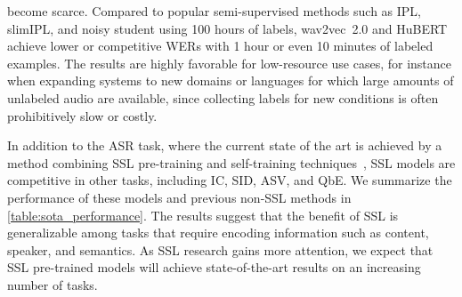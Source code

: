 become scarce. Compared to popular semi-supervised methods such as IPL,
slimIPL, and noisy student using 100 hours of labels, wav2vec~2.0 and HuBERT
achieve lower or competitive WERs with 1 hour or even 10 minutes of labeled
examples. The results are highly favorable for low-resource use cases, for instance when
expanding systems to new domains or languages for which large amounts of unlabeled
audio are available, since collecting labels for new conditions is often prohibitively
slow or costly.

In addition to the ASR task, where the current state of the art is achieved by a method
combining SSL pre-training and self-training 
techniques~\cite{zhang2020pushing}, SSL models 
  are competitive                %
in other tasks, including IC,
SID, ASV, and QbE. We summarize the performance of these models and previous
non-SSL methods in \cref{table:sota_performance}. The results suggest that the
benefit of SSL is generalizable among tasks that require encoding 
information such as content, speaker, and semantics. As SSL research
gains more attention, we expect that SSL pre-trained models will 
achieve state-of-the-art results on an increasing number of tasks.


